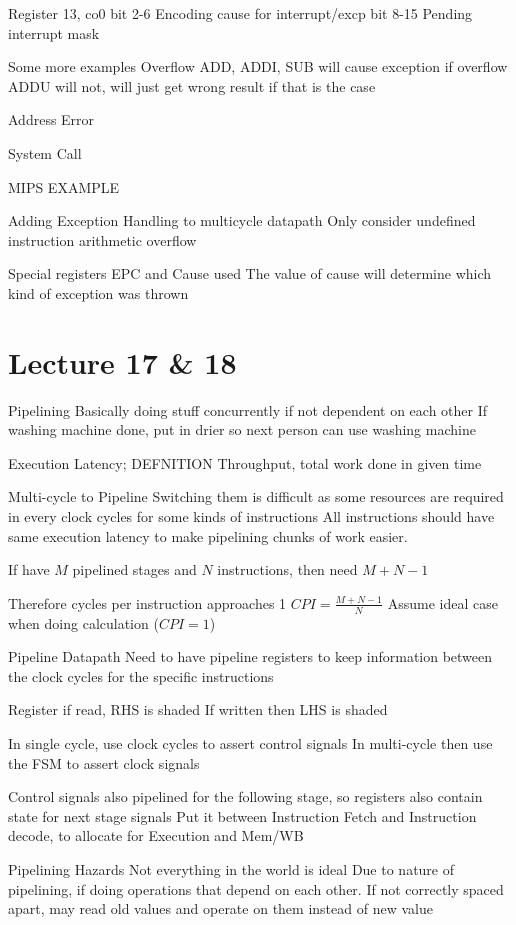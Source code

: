 \documentclass{article}
\begin{document}
		Register 13, co0
		bit 2-6	Encoding cause for interrupt/excp
		bit 8-15	Pending interrupt mask

	Some more examples
		Overflow
			ADD, ADDI, SUB will cause exception if overflow
			ADDU will not, will just get wrong result if that is the case

		Address Error

		System Call

		MIPS EXAMPLE

	Adding Exception Handling to multicycle datapath
		Only consider
			undefined instruction
			arithmetic overflow

		Special registers EPC and Cause used
			The value of cause will determine which kind of exception was thrown

\section*{Lecture 17 \& 18}
	Pipelining
		Basically doing stuff concurrently if not dependent on each other
		If washing machine done, put in drier so next person can use washing machine

		Execution Latency; DEFNITION
		Throughput, total work done in given time

	Multi-cycle to Pipeline
		Switching them is difficult as some resources are required in every clock cycles for some kinds of instructions
		All instructions should have same execution latency to make pipelining chunks of work easier.

		If have $M$ pipelined stages and $N$ instructions, then need $M + N - 1$

		Therefore cycles per instruction approaches 1
		$CPI = \frac{M + N - 1}{N}$
		Assume ideal case when doing calculation ($CPI = 1$)

	Pipeline Datapath
		Need to have pipeline registers to keep information between the clock cycles for the specific instructions

		Register if read, RHS is shaded
		If written then LHS is shaded

		In single cycle, use clock cycles to assert control signals
		In multi-cycle then use the FSM to assert clock signals

		Control signals also pipelined for the following stage, so registers also contain state for next stage signals
		Put it between Instruction Fetch and Instruction decode, to allocate for Execution and Mem/WB

	Pipelining Hazards
		Not everything in the world is ideal
		Due to nature of pipelining, if doing operations that depend on each other. If not correctly spaced apart, may read old values and operate on them instead of new value
\end{document}
